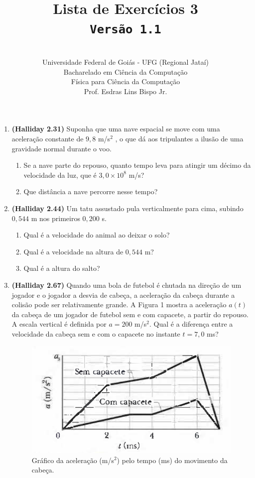 \documentclass[12pt,a4paper,oneside]{article}
\author{\\Universidade Federal de Goiás - UFG (Regional Jataí) \\Bacharelado em Ciência da Computação \\Física para Ciência da Computação \\Prof. Esdras Lins Bispo Jr.}
\title{
	{\sc \huge Lista de Exercícios 3} 
	\\{\tt Versão 1.1}
}
\begin{document}
\maketitle

\begin{enumerate}

\section{Conceitos}
	
	\item {\bf (Halliday 2.31)} Suponha que uma nave espacial se move com uma aceleração constante de $9,8$ m/s$^2$ , o que dá aos tripulantes a ilusão de uma gravidade normal durante o voo. 
		\begin{enumerate}
			\item Se a nave parte do repouso, quanto
			tempo leva para atingir um décimo da velocidade da luz, que é $3,0 \times 10^8$  m/s?
			\item Que distância a nave percorre nesse tempo?
		\end{enumerate}
	
	\item {\bf (Halliday 2.44)} Um tatu assustado pula verticalmente para cima, subindo $0,544$ m nos primeiros $0,200$ s. 
		\begin{enumerate}
			\item Qual é a velocidade do animal ao deixar o solo?
			\item Qual é a velocidade na altura de $0,544$ m?
			\item Qual é a altura do salto?
		\end{enumerate}	
	
	\item {\bf (Halliday 2.67)} Quando uma bola de futebol é chutada na direção de um jogador e o jogador a desvia de cabeça, a aceleração da cabeça durante a colisão pode ser relativamente grande. A Figura 1 mostra a aceleração $a(t)$ da cabeça de um jogador de futebol sem e com capacete, a partir do repouso. A escala vertical é definida por $a =
	200$ m/s$^2$. Qual é a diferença entre a velocidade da cabeça sem e com o capacete no instante $t = 7,0$ ms?
		\begin{figure}
			\begin{center}
				\includegraphics[scale=0.7]{imagens/grafico}
			\end{center}
			\caption{Gráfico da aceleração (m/s$^2$) pelo tempo (ms) do movimento da cabeça.}
		\end{figure}
		


\end{enumerate}
\end{document}
